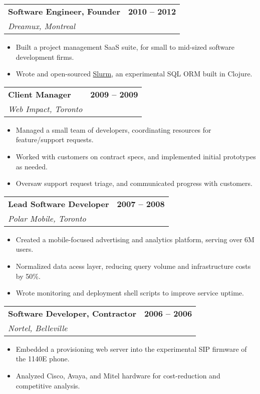 \documentclass[12pt]{article}
\makeatletter
\newenvironment{justifycolumns}
{\begin{tabular*}{\textwidth}{@{\extracolsep{\fill}}lr@{}}}
{\end{tabular*}}
\newcommand{\row}[2]{#1 & #2 \\}
\newcommand{\rowheading}[2]{\row{\textbf{#1}}{\textbf{#2}}}
\newcommand{\range}[2]{#1 -- #2}
\newcommand{\blockseparation}{\vspace{0.15in}}
\newenvironment{tightbullets}
{\begin{itemize}}
{\end{itemize}}
\newenvironment{bullets}
{\begin{tightbullets}}
{\end{tightbullets} \blockseparation}
\makeatother
\begin{document}
\begin{flushleft}
\pagebreak

\begin{justifycolumns}
	\rowheading{Software Engineer, Founder}{\range{2010}{2012}}
	\row{\emph{Dreamux, Montreal}}{}
\end{justifycolumns}
\begin{bullets}
	\item Built a project management SaaS suite, for small to mid-sized software development firms.
	\item Wrote and open-sourced \href{https://github.com/amcnamara/slurm}{Slurm}, an experimental SQL ORM built in Clojure.
\end{bullets}

\begin{justifycolumns}
	\rowheading{Client Manager}{\range{2009}{2009}}
	\row{\emph{Web Impact, Toronto}}{}
\end{justifycolumns}
\begin{bullets}
	\item Managed a small team of developers, coordinating resources for feature/support requests.
	\item Worked with customers on contract specs, and implemented initial prototypes as needed.
	\item Oversaw support request triage, and communicated progress with customers.
\end{bullets}

\begin{justifycolumns}
	\rowheading{Lead Software Developer}{\range{2007}{2008}}
	\row{\emph{Polar Mobile, Toronto}}{}
\end{justifycolumns}
\begin{bullets}
	\item Created a mobile-focused advertising and analytics platform, serving over 6M users.
	\item Normalized data acess layer, reducing query volume and infrastructure costs by 50\%.
	\item Wrote monitoring and deployment shell scripts to improve service uptime.
\end{bullets}

\begin{justifycolumns}
	\rowheading{Software Developer, Contractor}{\range{2006}{2006}}
	\row{\emph{Nortel, Belleville}}{}
\end{justifycolumns}
\begin{bullets}
	\item Embedded a provisioning web server into the experimental SIP firmware of the 1140E phone.
	\item Analyzed Cisco, Avaya, and Mitel hardware for cost-reduction and competitive analysis.
\end{bullets}



\end{flushleft}
\end{document}
